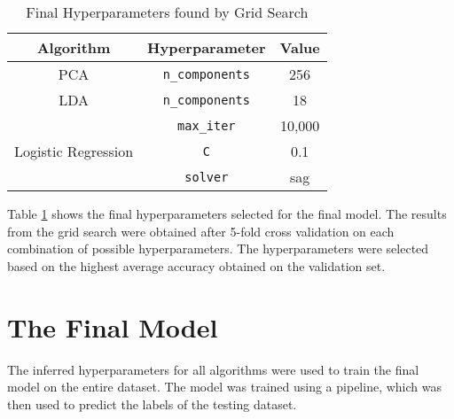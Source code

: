 \documentclass[conference]{IEEEtran}
\begin{document}
    \begin{table}[htbp]
        \caption{Final Hyperparameters found by Grid Search}
        \begin{center}
            \begin{tabular}{|c|c|c|}
                \hline
                \textbf{Algorithm} & \textbf{Hyperparameter} & \textbf{Value} \\
                \hline
                PCA & \texttt{n\_components} & 256 \\
                \hline
                LDA & \texttt{n\_components} & 18 \\
                \hline
                 & \texttt{max\_iter} & 10,000 \\
                \cline{2-3}
                Logistic Regression & \texttt{C} & 0.1 \\
                \cline{2-3}
                & \texttt{solver} & sag \\
                \hline
            \end{tabular}
            \label{tab:hyperparams}
        \end{center}
    \end{table}

    Table \ref{tab:hyperparams} shows the final hyperparameters selected for the final model.
    The results from the grid search were obtained after 5-fold cross validation on each combination of possible hyperparameters.
    The hyperparameters were selected based on the highest average accuracy obtained on the validation set.

    \section{The Final Model}
    \label{sec:finalmodel}
    The inferred hyperparameters for all algorithms were used to train the final model on the entire dataset.
    The model was trained using a pipeline, which was then used to predict the labels of the testing dataset. \\
    \vspace*{10pt}
\end{document}
